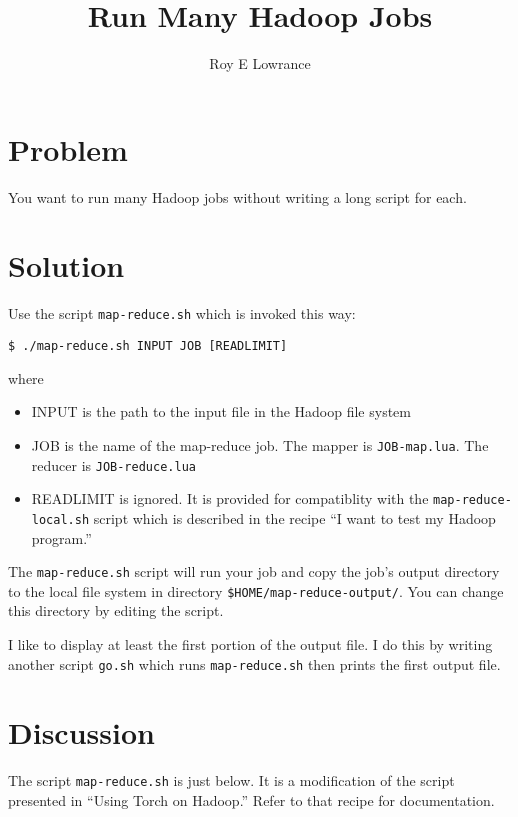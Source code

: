 \documentclass{article}
\let\code\texttt %
\begin{document}
\title{Run Many Hadoop Jobs}
\author{Roy E Lowrance}
\maketitle


\section{Problem}

You want to run many Hadoop jobs without writing a long script for each.

\section{Solution}

Use the script \code{map-reduce.sh} which is invoked this way:

\begin{verbatim}
$ ./map-reduce.sh INPUT JOB [READLIMIT]
\end{verbatim}

where
\begin{itemize}
  \item INPUT is the path to the input file in the Hadoop file system
  \item JOB is the name of the map-reduce job. The mapper is
    \code{JOB-map.lua}.  The reducer is \code{JOB-reduce.lua}
  \item READLIMIT is ignored. It is provided for compatiblity with the 
    \code{map-reduce-local.sh} script which is described in the recipe ``I
    want to test my Hadoop program.''
\end{itemize}

The \code{map-reduce.sh} script will run your job and copy the job's
output directory to the local file system in directory
\code{\$HOME/map-reduce-output/}. You can change this directory by
editing the script.

I like to display at least the first portion of the output file. I do
this by writing another script \code{go.sh} which runs \code{map-reduce.sh} then
prints the first output file.

\section{Discussion}

The script \code{map-reduce.sh} is just below. It is a modification of
the script presented in ``Using Torch on Hadoop.'' Refer to that recipe
for documentation.
\end{document}
